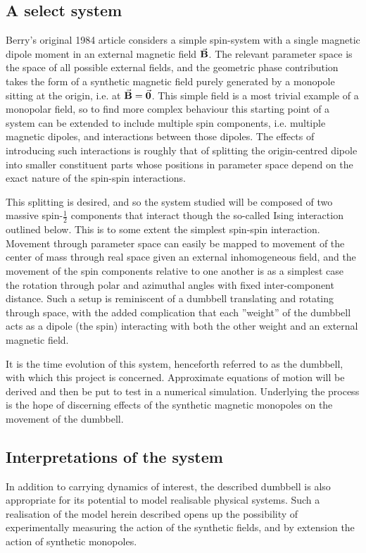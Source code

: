 \documentclass[main.tex]{subfiles}
\begin{document}
\subsection{A select system}\label{sec:aselsys}
Berry's original 1984 article considers a simple spin-system with a single magnetic dipole
moment in an external magnetic field \(\va{B}\). The relevant parameter space is the space of all
possible external fields, and the geometric phase contribution takes the form of a
synthetic magnetic field purely generated by a monopole sitting at the origin, i.e. at
\(\va{B} = \va{0}\). This simple field is a most trivial example of a monopolar field,
so to find more complex behaviour this starting point of a system can be extended to
include multiple spin components, i.e. multiple magnetic dipoles, and interactions between
those dipoles. The effects of introducing such interactions is roughly that of splitting
the origin-centred dipole into smaller constituent parts whose positions in parameter space
depend on the exact nature of the spin-spin interactions\cite{eriksson}.

This splitting is desired, and so the system studied will be composed of two massive
spin-\(\frac{1}{2}\) components that interact though the so-called Ising interaction
outlined below. This is to some extent the simplest spin-spin interaction. Movement through
parameter space can easily be mapped to movement of the center of mass through real space given an external
inhomogeneous field, and the movement of the spin components relative to one another is as
a simplest case the rotation through polar and azimuthal angles with fixed inter-component
distance. Such a setup is reminiscent of a dumbbell translating and rotating through space,
with the added complication that each ''weight'' of the dumbbell acts as a dipole (the
spin) interacting with both the other weight and an external magnetic field. %

It is the time evolution of this system, henceforth referred to as the dumbbell, with which
this project is concerned. Approximate equations of motion will be derived and then be put
to test in a numerical simulation. Underlying the process is the hope of discerning effects of the synthetic
magnetic monopoles on the movement of the dumbbell.
\subsection{Interpretations of the system}
In addition to carrying dynamics of interest, the described dumbbell is also appropriate
for its potential to model realisable physical systems. Such a realisation of the model
herein described opens up the possibility of experimentally measuring the action of the
synthetic fields, and by extension the action of synthetic monopoles.
\end{document}
